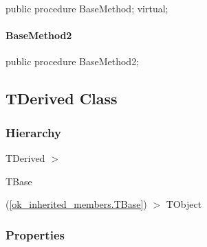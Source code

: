 \documentclass{report}
\begin{document}
\begin{list}{}{
\setlength{\itemindent}{0cm}
\setlength{\listparindent}{0cm}
\setlength{\leftmargin}{\evensidemargin}
\addtolength{\leftmargin}{\tmplength}
\settowidth{\labelsep}{X}
\addtolength{\leftmargin}{\labelsep}
\setlength{\labelwidth}{\tmplength}
}
\begin{flushleft}
\item[\textbf{Declaration}\hfill]
\begin{ttfamily}
public procedure BaseMethod; virtual;\end{ttfamily}


\end{flushleft}
\end{list}
\paragraph*{BaseMethod2}\hspace*{\fill}

\begin{list}{}{
\setlength{\itemindent}{0cm}
\setlength{\listparindent}{0cm}
\setlength{\leftmargin}{\evensidemargin}
\addtolength{\leftmargin}{\tmplength}
\settowidth{\labelsep}{X}
\addtolength{\leftmargin}{\labelsep}
\setlength{\labelwidth}{\tmplength}
}
\begin{flushleft}
\item[\textbf{Declaration}\hfill]
\begin{ttfamily}
public procedure BaseMethod2;\end{ttfamily}


\end{flushleft}
\end{list}
\subsection*{TDerived Class}
\subsubsection*{\large{\textbf{Hierarchy}}\normalsize\hspace{1ex}\hfill}
TDerived {$>$} \begin{ttfamily}TBase\end{ttfamily}(\ref{ok_inherited_members.TBase}) {$>$} 
TObject
\subsubsection*{\large{\textbf{Properties}}\normalsize\hspace{1ex}\hfill}
\end{document}
